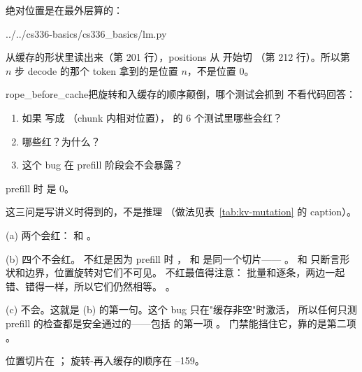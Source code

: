绝对位置是在最外层算的：

%
  {../../cs336-basics/cs336_basics/lm.py}

 从缓存的形状里读出来（第 201 行），positions 从  开始切
（第 212 行）。所以第 $n$ 步 decode 的那个 token 拿到的是位置 $n$，不是位置 0。

\begin{checkpoint}{rope_before_cache}{把旋转和入缓存的顺序颠倒，哪个测试会抓到}
不看代码回答：
\begin{enumerate}[label=(\alph*)]
  \item 如果  写成 （chunk 内相对位置），
         的 6 个测试里哪些会红？
  \item 哪些红？为什么？
  \item 这个 bug 在 prefill 阶段会不会暴露？
\end{enumerate}
\hint prefill 时  是 0。

\ifshowanswers
\tcblower
\answer 这三问是写讲义时得到的，不是推理
（做法见表~\ref{tab:kv-mutation} 的 caption）。

(a) 两个会红： 和
。

(b) 四个不会红。 不红是因为 prefill 时
， 和  是同一个切片——
。
 和
 只断言形状和边界，位置旋转对它们不可见。
 不红最值得注意：
批量和逐条，两边一起错、错得一样，所以它们仍然相等。
。

(c) 不会。这就是 (b) 的第一句。这个 bug 只在"缓存非空"时激活，
所以任何只测 prefill 的检查都是安全通过的——包括
 的第一项 。
门禁能挡住它，靠的是第二项 。

\whereincode 位置切片在 ；
旋转-再入缓存的顺序在 --159。
\fi
\end{checkpoint}

